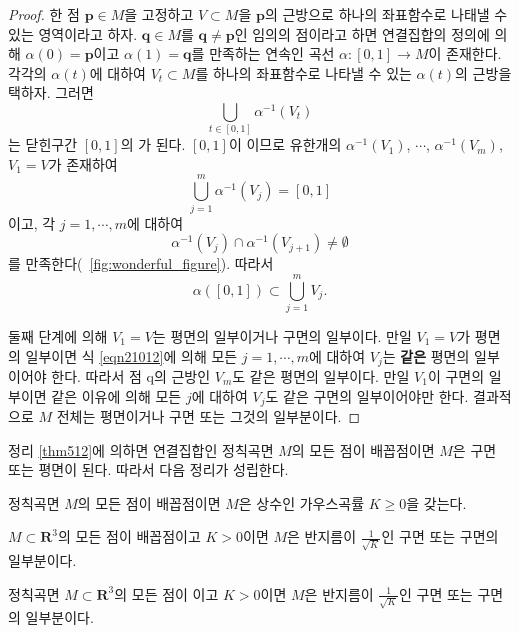 \begin{proof}
한 점 $\mathbf{p}\in M$을 고정하고 $V\subset M$을
$\mathbf{p}$의 근방으로 하나의 좌표함수로 나태낼 수 있는 영역이라고 하자.
$\mathbf{q}\in M$를 $\mathbf{q}\ne \mathbf{p}$인 임의의 점이라고 하면
연결집합의 정의에 의해
$\alpha(0) = \mathbf{p}$이고 $\alpha(1) = \mathbf{q}$를 만족하는
연속인 곡선 $\alpha : [0,1] \to M$이 존재한다. 각각의 $\alpha(t)$에 대하여
$V_t \subset M$를 하나의 좌표함수로 나타낼 수 있는 $\alpha(t)$의 근방을 택하자.
그러면
\[
\bigcup_{t \in [0,1]}\alpha^{-1}(V_t)
\]
는 닫힌구간 $[0,1]$의 가 된다. $[0,1]$이 이므로
유한개의  $\alpha^{-1}(V_1)$, $\cdots$, $\alpha^{-1}(V_m)$, $V_1 = V$가 존재하여
\[
\bigcup_{j= 1}^m\alpha^{-1}(V_j) = [0,1]
\]
이고, 각 $j=1, \cdots, m$에 대하여
\begin{equation}
\alpha^{-1}(V_j) \cap \alpha^{-1}(V_{j+1})\ne \emptyset\label{eqn21012}
\end{equation}
를 만족한다(\figurename~\ref{fig:wonderful_figure}). 따라서
\[
\alpha([0,1]) \subset \bigcup_{j=1}^m V_j.
\]

둘째 단계에 의해 $V_1 = V$는 평면의 일부이거나 구면의 일부이다. 만일 $V_1 = V$가 평면의 일부이면 식 \eqref{eqn21012}에 의해
모든 $j = 1, \cdots, m$에 대하여 $V_j$는 \textbf{같은} 평면의 일부이어야 한다.
따라서 점 $\mathrm{q}$의 근방인 $V_m$도 같은 평면의 일부이다.
만일 $V_1$이 구면의 일부이면 같은 이유에 의해 모든 $j$에 대하여
$V_j$도 같은 구면의 일부이어야만 한다. 결과적으로 $M$ 전체는
평면이거나 구면 또는 그것의 일부분이다.
\end{proof}


정리 \ref{thm512}에 의하면 연결집합인 정칙곡면
 $M$의 모든 점이 배꼽점이면 $M$은 구면 또는 평면이 된다. 따라서
다음 정리가 성립한다.

\begin{cor}\label{cor513}
정칙곡면 $M$의 모든 점이 배꼽점이면 $M$은 상수인 가우스곡률
$K \ge 0$을 갖는다.
\end{cor}

\begin{thm}[정칙곡면과 구의 관계]\label{thm514}
 $M \subset  \mathbf{R}^3$의 모든 점이 배꼽점이고
$K > 0$이면 $M$은 반지름이 $\displaystyle \frac{1}{\sqrt K}$인 구면 또는
구면의 일부분이다.
\end{thm}

\begin{cor}\label{surface}
정칙곡면 $M \subset  \mathbf{R}^3$의 모든 점이 이고
$K > 0$이면 $M$은 반지름이 $\displaystyle \frac{1}{\sqrt K}$인 구면 또는
구면의 일부분이다.
\end{cor}


